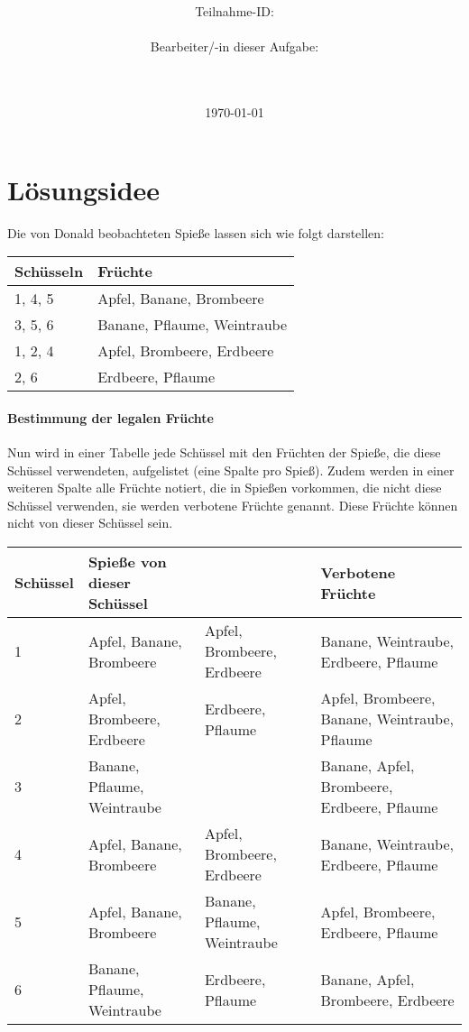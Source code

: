 \documentclass[a4paper,10pt,ngerman]{scrartcl}
\title{\textbf{\Huge\Aufgabe}}
\author{\LARGE Teilnahme-ID: \LARGE \TeilnahmeId \\\\
	    \LARGE Bearbeiter/-in dieser Aufgabe: \\ 
	    \LARGE \Name\\\\}
\date{\LARGE\today}
\begin{document}
\maketitle
\tableofcontents

\vspace{0.5cm}

\section{Lösungsidee}
Die von Donald beobachteten Spieße lassen sich wie folgt darstellen:

\begin{center}
\begin{tabular}{l|l}
    \textbf{Schüsseln} & \textbf{Früchte} \\
    \hline
    1, 4, 5 & Apfel, Banane, Brombeere \\
    3, 5, 6 & Banane, Pflaume, Weintraube \\
    1, 2, 4 & Apfel, Brombeere, Erdbeere \\
    2, 6 & Erdbeere, Pflaume
\end{tabular}
\end{center}

\paragraph{Bestimmung der legalen Früchte}
Nun wird in einer Tabelle jede Schüssel mit den Früchten der Spieße, die diese Schüssel verwendeten, aufgelistet (eine Spalte pro Spieß).
Zudem werden in einer weiteren Spalte alle Früchte notiert, die in Spießen vorkommen, die nicht diese Schüssel verwenden, sie werden verbotene Früchte genannt.
Diese Früchte können nicht von dieser Schüssel sein.

\begin{center}
\begin{tabularx}{\linewidth}{l|X|X|X}
    \textbf{Schüssel} & \textbf{Spieße von dieser Schüssel} & & \textbf{Verbotene Früchte} \\
    \hline
    1 & Apfel, Banane, Brombeere & Apfel, Brombeere, Erdbeere & Banane, Weintraube, Erdbeere, Pflaume \\
    \hline
    2 & Apfel, Brombeere, Erdbeere & Erdbeere, Pflaume & Apfel, Brombeere, Banane, Weintraube, Pflaume \\
    \hline
    3 & Banane, Pflaume, Weintraube & & Banane, Apfel, Brombeere, Erdbeere, Pflaume \\
    \hline
    4 & Apfel, Banane, Brombeere & Apfel, Brombeere, Erdbeere & Banane, Weintraube, Erdbeere, Pflaume \\
    \hline
    5 & Apfel, Banane, Brombeere & Banane, Pflaume, Weintraube & Apfel, Brombeere, Erdbeere, Pflaume \\
    \hline
    6 & Banane, Pflaume, Weintraube & Erdbeere, Pflaume & Banane, Apfel, Brombeere, Erdbeere
\end{tabularx}
\end{center}
\end{document}

